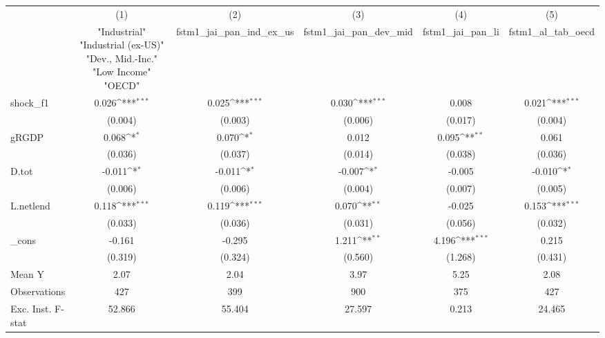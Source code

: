 {
\def\sym#1{\ifmmode^{#1}\else\(^{#1}\)\fi}
\begin{tabular}{l*{5}{c}}
\toprule
            &\multicolumn{1}{c}{(1)}&\multicolumn{1}{c}{(2)}&\multicolumn{1}{c}{(3)}&\multicolumn{1}{c}{(4)}&\multicolumn{1}{c}{(5)}\\
            &\multicolumn{1}{c}{ "Industrial" "Industrial (ex-US)" "Dev., Mid.-Inc." "Low Income" "OECD" }&\multicolumn{1}{c}{fstm1\_jai\_pan\_ind\_ex\_us}&\multicolumn{1}{c}{fstm1\_jai\_pan\_dev\_mid}&\multicolumn{1}{c}{fstm1\_jai\_pan\_li}&\multicolumn{1}{c}{fstm1\_al\_tab\_oecd}\\
\midrule
shock\_f1    &       0.026\sym{***}&       0.025\sym{***}&       0.030\sym{***}&       0.008         &       0.021\sym{***}\\
            &     (0.004)         &     (0.003)         &     (0.006)         &     (0.017)         &     (0.004)         \\
\addlinespace
gRGDP       &       0.068\sym{*}  &       0.070\sym{*}  &       0.012         &       0.095\sym{**} &       0.061         \\
            &     (0.036)         &     (0.037)         &     (0.014)         &     (0.038)         &     (0.036)         \\
\addlinespace
D.tot       &      -0.011\sym{*}  &      -0.011\sym{*}  &      -0.007\sym{*}  &      -0.005         &      -0.010\sym{*}  \\
            &     (0.006)         &     (0.006)         &     (0.004)         &     (0.007)         &     (0.005)         \\
\addlinespace
L.netlend   &       0.118\sym{***}&       0.119\sym{***}&       0.070\sym{**} &      -0.025         &       0.153\sym{***}\\
            &     (0.033)         &     (0.036)         &     (0.031)         &     (0.056)         &     (0.032)         \\
\addlinespace
\_cons      &      -0.161         &      -0.295         &       1.211\sym{**} &       4.196\sym{***}&       0.215         \\
            &     (0.319)         &     (0.324)         &     (0.560)         &     (1.268)         &     (0.431)         \\
\midrule
Mean Y      &        2.07         &        2.04         &        3.97         &        5.25         &        2.08         \\
Observations&         427         &         399         &         900         &         375         &         427         \\
Exc. Inst. F-stat&      52.866         &      55.404         &      27.597         &       0.213         &      24.465         \\
\bottomrule
\end{tabular}
}
